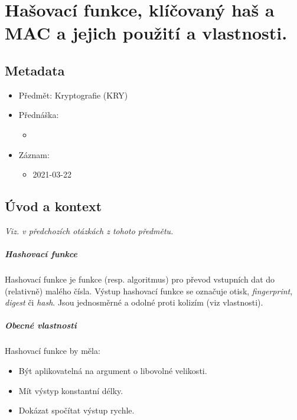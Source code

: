 

\chapter{Hašovací funkce, klíčovaný haš a MAC a jejich použití a vlastnosti.}


\section{Metadata}

\begin{itemize}
    \item Předmět: Kryptografie (KRY)
    \item Přednáška:
    \begin{itemize}
        \item {}
    \end{itemize}
    \item Záznam:
    \begin{itemize}
        \item 2021-03-22
    \end{itemize}
\end{itemize}


\section{Úvod a kontext}

\textit{Viz.  v předchozích otázkách z tohoto předmětu.}

\paragraph*{Hashovací funkce} Hashovací funkce je funkce (resp. algoritmus) pro převod vstupních dat do (relativně) malého čísla. Výstup hashovací funkce se označuje otisk, \textit{fingerprint}, \textit{digest} či \textit{hash}. Jsou jednosměrné a odolné proti kolizím (viz vlastnosti).

\paragraph*{Obecné vlastnosti} Hashovací funkce by měla: \begin{itemize}
    \item Být aplikovatelná na argument o libovolné velikosti.
    \item Mít výstyp konstantní délky.
    \item Dokázat spočítat výstup rychle.
\end{itemize}

